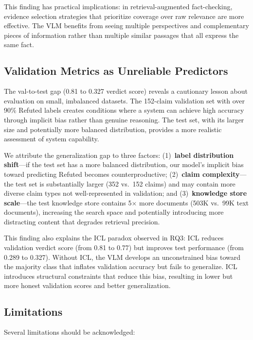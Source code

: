 This finding has practical implications: in retrieval-augmented fact-checking, evidence selection strategies that prioritize coverage over raw relevance are more effective. The VLM benefits from seeing multiple perspectives and complementary pieces of information rather than multiple similar passages that all express the same fact.

\subsection{Validation Metrics as Unreliable Predictors}

The val-to-test gap (0.81 to 0.327 verdict score) reveals a cautionary lesson about evaluation on small, imbalanced datasets. The 152-claim validation set with over 90\% Refuted labels creates conditions where a system can achieve high accuracy through implicit bias rather than genuine reasoning. The test set, with its larger size and potentially more balanced distribution, provides a more realistic assessment of system capability.

We attribute the generalization gap to three factors: (1)~\textbf{label distribution shift}---if the test set has a more balanced distribution, our model's implicit bias toward predicting Refuted becomes counterproductive; (2)~\textbf{claim complexity}---the test set is substantially larger (352 vs.\ 152 claims) and may contain more diverse claim types not well-represented in validation; and (3)~\textbf{knowledge store scale}---the test knowledge store contains 5$\times$ more documents (503K vs.\ 99K text documents), increasing the search space and potentially introducing more distracting content that degrades retrieval precision.

This finding also explains the ICL paradox observed in RQ3: ICL reduces validation verdict score (from 0.81 to 0.77) but improves test performance (from 0.289 to 0.327). Without ICL, the VLM develops an unconstrained bias toward the majority class that inflates validation accuracy but fails to generalize. ICL introduces structural constraints that reduce this bias, resulting in lower but more honest validation scores and better generalization.

\subsection{Limitations}

Several limitations should be acknowledged:

